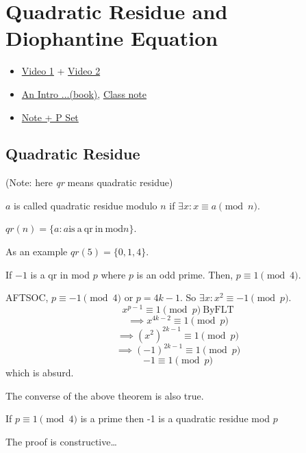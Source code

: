 \chapter{Quadratic Residue and Diophantine Equation}%
\begin{linkb}
   \begin{itemize}
        \item \href{https://www.youtube.com/watch?v=YeurXbh2sIQ}{Video 1} + \href{https://www.youtube.com/watch?v=3ZBGv6dH37o}{Video 2}
        \item \href{https://drive.google.com/file/d/1lHBgt42uKI6qc0-Yt_Sx7boahxsYLVN7/view}{An Intro ...(book)}, \href{https://drive.google.com/file/d/12nate-JVlXwJUkMS7ja6ftBvyTWatace/view?usp=sharing}{Class note}
        
        \item \href{https://drive.google.com/file/d/16tC_XxRU31j_iOVZ3gEb_BMcZlQBfIP7/view?usp=sharing}{Note + P Set}
   \end{itemize}
\end{linkb}
\section{Quadratic Residue}

(Note: here \textit{qr} means quadratic residue)

\begin{definition}
$a$ is called quadratic residue modulo $n$ if $\exists x: x\equiv a \pmod n$. 
\end{definition}

\begin{definition}
$qr(n)=\{a:a \mathrm{is \ a \ qr \ in \ mod} n \}$.
\end{definition}
As an example $qr(5)=\{0,1,4\}$.

\begin{theorem}
If $-1$ is a qr in mod $p$ where $p$ is an odd prime. Then, $ p \equiv 1 \pmod 4$.
\end{theorem}

AFTSOC, $p\equiv -1 \pmod 4$ or $p = 4k-1$.
So $\exists x : x^2\equiv -1 \pmod p$. 
\[x^{p-1}\equiv 1 \pmod p \ \mathrm{By FLT}\]
\[\implies x^{4k-2}\equiv 1\pmod p\]
\[\implies (x^2)^{2k-1}\equiv 1 \pmod p\]
\[\implies (-1)^{2k-1}\equiv 1 \pmod p\]
\[-1\equiv 1 \pmod p\]
which is absurd.

The converse of the above theorem is also true.
\begin{theorem}
If $ p \equiv 1 \pmod 4$ is a prime then -1 is a quadratic residue mod $p$
\end{theorem}
The proof is constructive\ldots


